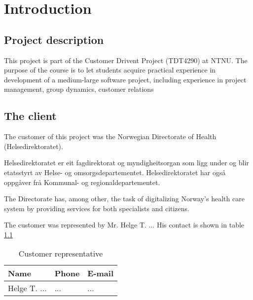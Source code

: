 
\chapter{Introduction} %

\label{Introduction} %



\section{Project description}

This project is part of the Customer Drivent Project (TDT4290) at NTNU.
The purpose of the course is to let students acquire practical experience in development of a medium-large software project,
including experience in project management, group dynamics, customer relations



\section{The client}
The customer of this project was the Norwegian Directorate of Health (Helsedirektoratet).

Helsedirektoratet er eit fagdirektorat og myndigheitsorgan som ligg under og blir etatsstyrt av Helse- og omsorgsdepartementet. Helsedirektoratet har også oppgåver frå Kommunal- og regionaldepartementet.

The Directorate has, among other, the task of digitalizing Norway's health care system by providing services for both specialists and citizens.

The customer was represented by Mr. Helge T. ... His contact is shown in table \ref{table:client}

\begin{center}
\begin{table}
\begin{tabular}{ l | l | l }
  \hline
  Name & Phone & E-mail \\
  \hline\noalign{\smallskip}\noalign{\smallskip}\hline
  Helge T. ...	& ... & ... \\
  \hline
\end{tabular}
\caption{Customer representative}
\label{table:client}
\end{table}
\end{center}

